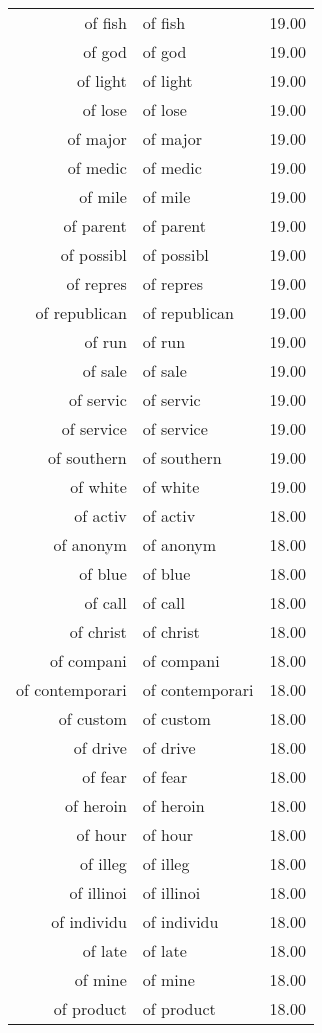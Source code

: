 \begin{table}[ht]
\begin{tabular}{rlr}
  of fish & of fish & 19.00 \\ 
  of god & of god & 19.00 \\ 
  of light & of light & 19.00 \\ 
  of lose & of lose & 19.00 \\ 
  of major & of major & 19.00 \\ 
  of medic & of medic & 19.00 \\ 
  of mile & of mile & 19.00 \\ 
  of parent & of parent & 19.00 \\ 
  of possibl & of possibl & 19.00 \\ 
  of repres & of repres & 19.00 \\ 
  of republican & of republican & 19.00 \\ 
  of run & of run & 19.00 \\ 
  of sale & of sale & 19.00 \\ 
  of servic & of servic & 19.00 \\ 
  of service & of service & 19.00 \\ 
  of southern & of southern & 19.00 \\ 
  of white & of white & 19.00 \\ 
  of activ & of activ & 18.00 \\ 
  of anonym & of anonym & 18.00 \\ 
  of blue & of blue & 18.00 \\ 
  of call & of call & 18.00 \\ 
  of christ & of christ & 18.00 \\ 
  of compani & of compani & 18.00 \\ 
  of contemporari & of contemporari & 18.00 \\ 
  of custom & of custom & 18.00 \\ 
  of drive & of drive & 18.00 \\ 
  of fear & of fear & 18.00 \\ 
  of heroin & of heroin & 18.00 \\ 
  of hour & of hour & 18.00 \\ 
  of illeg & of illeg & 18.00 \\ 
  of illinoi & of illinoi & 18.00 \\ 
  of individu & of individu & 18.00 \\ 
  of late & of late & 18.00 \\ 
  of mine & of mine & 18.00 \\ 
  of product & of product & 18.00 \\ 

\end{tabular}
\end{table}
